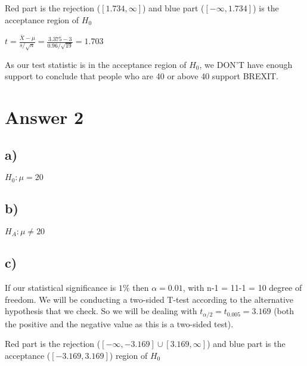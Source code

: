 \documentclass[12pt]{article}
\begin{document}
Red part is the rejection ($[1.734, \infty]$) and blue part ($[-\infty, 1.734]$) is the acceptance region of $H_0$\\ \par

$t = \frac{\bar{X} - \mu}{s/\sqrt{n}} = \frac{3.375 - 3}{0.96/\sqrt{19}} = 1.703$\\ \par 
As our test statistic is in the acceptance region of $H_0$, we DON'T have enough support to conclude that people who are 40 or above 40 support BREXIT.
\section*{Answer 2}
\subsection*{a)}
$H_0 : \mu = 20$
\subsection*{b)}
$H_A : \mu \neq 20$
\subsection*{c)}
If our statistical significance is $1 \%$ then $\alpha = 0.01$, with n-1 = 11-1 = 10 degree of freedom. We will be conducting a two-sided T-test according to the alternative hypothesis that we check. So we will be dealing with $t_{\alpha / 2} = t_{0.005} = 3.169$ (both the positive and the negative value as this is a two-sided test).\\ \par


Red part is the rejection ($[-\infty, -3.169] \cup [3.169, \infty]$) and blue part is the acceptance ($[-3.169, 3.169]$) region of $H_0$\\ \par
\end{document}

